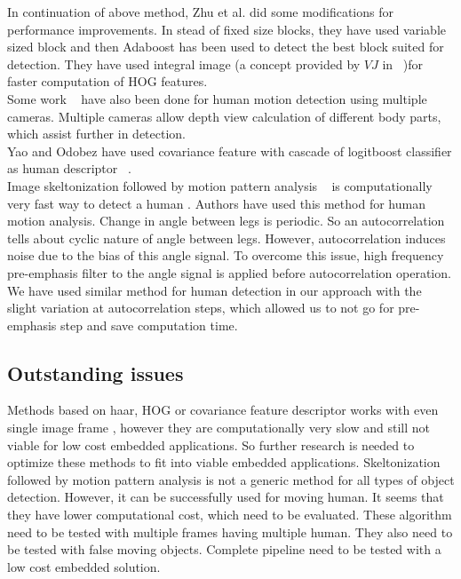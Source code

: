 \indent In continuation of above method, Zhu et al. did some
modifications for performance improvements. In stead of fixed size
blocks, they have used variable sized block and then Adaboost has been
used to detect the best block suited for detection. They have used
integral image (a concept provided by $VJ$ in ~\cite{17})for faster
computation of HOG features.\\

\indent Some work ~\cite{30} have also been done for human motion
detection using multiple cameras. Multiple cameras allow depth view
calculation of different body parts, which assist further in
detection.\\

\indent Yao and Odobez have used covariance feature with cascade of logitboost
classifier as human descriptor ~\cite{19}.\\

\indent Image skeltonization followed by motion pattern analysis
~\cite{32, 22, 31} is computationally very fast way to detect a human .
Authors have used this method for human motion analysis. Change in angle
between legs is periodic. So an autocorrelation tells about cyclic
nature of angle between legs.  However, autocorrelation induces noise
due to the bias of this angle signal.  To overcome this issue, high
frequency pre-emphasis filter to the angle signal is applied before
autocorrelation operation. We have used similar method for human
detection in our approach with the slight variation at autocorrelation
steps, which allowed us to not go for pre-emphasis step and save
computation time.\\

\subsection{Outstanding issues}
\indent Methods based on haar, HOG or covariance feature descriptor
works with even single image frame , however they are computationally
very slow and still not viable for low cost embedded applications. So
further research is needed to optimize these methods to fit into viable
embedded applications. Skeltonization followed by motion pattern
analysis is not a generic method for all types of object detection.
However, it can be successfully used for moving human. It seems that
they have lower computational cost, which need to be evaluated. These
algorithm need to be tested with multiple frames having multiple human.
They also need to be tested with false moving objects. Complete pipeline
need to be tested with a low cost embedded solution.\\

